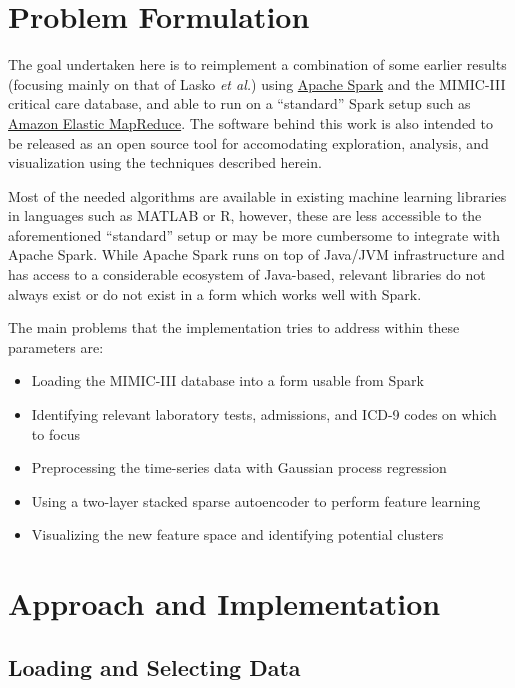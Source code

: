 \documentclass[journal]{IEEEtran}
\begin{document}
\section{Problem Formulation}

The goal undertaken here is to reimplement a combination of some
earlier results (focusing mainly on that of Lasko \emph{et
  al.}\cite{Lasko2013}) using \href{http://spark.apache.org/}{Apache
  Spark} and the MIMIC-III critical care database\cite{Johnson2016a},
and able to run on a ``standard'' Spark setup such as
\href{https://aws.amazon.com/emr/}{Amazon Elastic MapReduce}. The
software behind this work is also intended to be released as an open
source tool for accomodating exploration, analysis, and visualization
using the techniques described herein.

Most of the needed algorithms are available in existing machine
learning libraries in languages such as MATLAB or R, however, these
are less accessible to the aforementioned ``standard'' setup or may be
more cumbersome to integrate with Apache Spark.  While Apache Spark
runs on top of Java/JVM infrastructure and has access to a
considerable ecosystem of Java-based, relevant libraries do not always
exist or do not exist in a form which works well with Spark.


The main problems that the implementation tries to address within
these parameters are:

\begin{itemize}
\item{Loading the MIMIC-III database into a form usable from Spark}
\item{Identifying relevant laboratory tests, admissions, and ICD-9
  codes on which to focus}
\item{Preprocessing the time-series data with Gaussian process
  regression}
\item{Using a two-layer stacked sparse autoencoder to perform feature
  learning}
\item{Visualizing the new feature space and identifying potential
  clusters}
\end{itemize}

\section{Approach and Implementation}

\subsection{Loading and Selecting Data}
\end{document}
